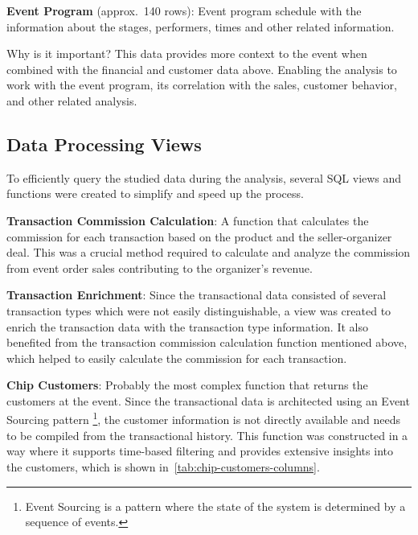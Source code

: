\textbf{Event Program} (approx.\ 140 rows): Event program schedule with the information about the stages, performers, times and other related information.

\begin{blue-box}{Why is it important?}
	This data provides more context to the event when combined with the financial and customer data above.
	Enabling the analysis to work with the event program, its correlation with the sales, customer behavior, and other related analysis.
\end{blue-box}

\subsection{Data Processing Views}
\label{subsec:data-methodology-structure-views}
To efficiently query the studied data during the analysis, several SQL views and functions were created to simplify and speed up the process.

\textbf{Transaction Commission Calculation}: A function that calculates the commission for each transaction based on the product and the seller-organizer deal.
This was a crucial method required to calculate and analyze the commission from event order sales contributing to the organizer's revenue.

\textbf{Transaction Enrichment}: Since the transactional data consisted of several transaction types which were not easily distinguishable, a view was created to enrich the transaction data with the transaction type information.
It also benefited from the transaction commission calculation function mentioned above, which helped to easily calculate the commission for each transaction.

\textbf{Chip Customers}: Probably the most complex function that returns the customers at the event.
Since the transactional data is architected using an Event Sourcing pattern
\footnote{Event Sourcing is a pattern where the state of the system is determined by a sequence of events\cite{aw_implementing_event_sourcing_using_a_relational_database}.}, the customer information
is not directly available and needs to be compiled from the transactional history.
This function was constructed in a way where it supports time-based filtering and provides extensive insights into the customers, which is shown in~\autoref{tab:chip-customers-columns}.

